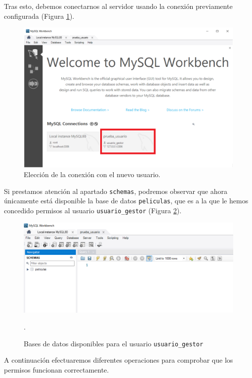 \documentclass[a4paper]{article}
\begin{document}
Tras esto, debemos conectarnos al servidor usando la conexión previamente configurada (Figura \ref{fig:eleccion-conexion}).

\begin{figure}[H]
    \centering
    \includegraphics[width=\textwidth]{figs/gestion-usuarios/elegir_conexion_usr.PNG}
    \caption{Elección de la conexión con el nuevo usuario.}
    \label{fig:eleccion-conexion}
\end{figure}

Si prestamos atención al apartado \texttt{schemas}, podremos observar que ahora únicamente está disponible la base de datos \texttt{peliculas}, que es a la que le hemos concedido permisos al usuario \texttt{usuario\_gestor} (Figura \ref{fig:bbdd-disp}).

\begin{figure}[H]
    \centering
    \includegraphics[width=\textwidth]{figs/gestion-usuarios/schemas_disponibles_usr.PNG}
    \caption{Bases de datos disponibles para el usuario \texttt{usuario\_gestor}}.
    \label{fig:bbdd-disp}
\end{figure}

A continuación efectuaremos diferentes operaciones para comprobar que los permisos funcionan correctamente.
\end{document}

